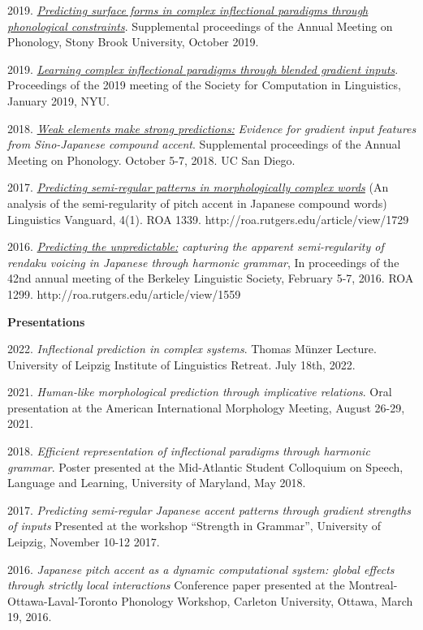 \documentclass[11pt]{article}
\newcommand{\itt}[1]{\textit{#1}}
\newcommand{\bo}[1]{\textbf{#1}}
\newcommand{\bi}{\begin{itemize}}
\newcommand{\ii}{\item}
\begin{document}
\begin{enumerate}[label={[\arabic*]}]
\ii  2019. \href{https://journals.linguisticsociety.org/proceedings/index.php/amphonology/article/view/4683}{\itt{Predicting surface forms in complex inflectional paradigms through phonological constraints}}. Supplemental proceedings of the Annual Meeting on Phonology, Stony Brook University, October 2019.
\ii 2019. \href{https://scholarworks.umass.edu/scil/vol2/iss1/12/}{\itt{Learning complex inflectional paradigms through blended gradient inputs}}. Proceedings of the 2019 meeting of the Society for Computation in Linguistics, January 2019, NYU. 
\ii 2018. \href{https://journals.linguisticsociety.org/proceedings/index.php/amphonology/article/view/4571}{\itt{Weak elements make strong predictions:}} \itt{Evidence for gradient input features from Sino-Japanese compound accent}. Supplemental proceedings of the Annual Meeting on Phonology. October 5-7, 2018. UC San Diego.
\ii 2017. \href{http://roa.rutgers.edu/article/view/1729}{\textit{Predicting semi-regular patterns in morphologically complex words}} (An analysis of the semi-regularity of pitch accent in Japanese compound words) Linguistics Vanguard, 4(1). ROA 1339. http://roa.rutgers.edu/article/view/1729
\ii 2016. \href{http://roa.rutgers.edu/content/article/files/1559_rosen_1.pdf}{\textit{Predicting the unpredictable:}} \textit{capturing the apparent semi-regularity of rendaku voicing in Japanese through harmonic grammar}, In proceedings of the 42nd annual meeting of the Berkeley Linguistic Society, February 5-7, 2016. ROA 1299. http://roa.rutgers.edu/article/view/1559
\end{enumerate}

\noindent \bo{Presentations}


\begin{enumerate}[label={[P\arabic*]}]
\ii 2022. \textit{Inflectional prediction in complex systems}. Thomas M\"unzer Lecture. University of Leipzig Institute of Linguistics Retreat. July 18th, 2022.
\ii 2021. \textit{Human-like morphological prediction through implicative relations}. Oral presentation at  the American International Morphology Meeting, August 26-29, 2021.
\ii 2018. \itt{Efficient representation of inflectional paradigms through harmonic grammar}. Poster presented at the Mid-Atlantic Student Colloquium on Speech, Language and Learning, University of Maryland, May 2018.
\ii 2017. \textit{Predicting semi-regular Japanese accent patterns through gradient strengths of inputs} Presented at the workshop ``Strength in Grammar'', University of Leipzig, November 10-12 2017.
\ii 2016. \textit{Japanese pitch accent as a dynamic computational system: global effects through strictly local interactions} Conference paper presented at the Montreal-Ottawa-Laval-Toronto Phonology Workshop, Carleton University, Ottawa, March 19, 2016.
\end{enumerate}
\end{document}

